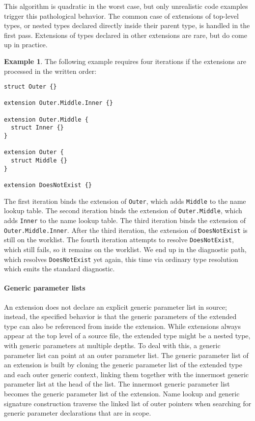 \documentclass[a4paper,headsepline,bibliography=totoc,toc=flat,fleqn,twoside=semi]{scrbook}
\theoremstyle{definition}
\theoremstyle{definition}
\newtheorem{example}{Example}[chapter]
\theoremstyle{definition}
\begin{document}
This algorithm is quadratic in the worst case, but only unrealistic code examples trigger this pathological behavior. The common case of extensions of top-level types, or nested types declared directly inside their parent type, is handled in the first pass. Extensions of types declared in other extensions are rare, but do come up in practice.

\begin{example}
The following example requires four iterations if the extensions are processed in the written order:
\begin{Verbatim}
struct Outer {}

extension Outer.Middle.Inner {}

extension Outer.Middle {
  struct Inner {}
}

extension Outer {
  struct Middle {}
}

extension DoesNotExist {}
\end{Verbatim}
The first iteration binds the extension of \texttt{Outer}, which adds \texttt{Middle} to the name lookup table. The second iteration binds the extension of \texttt{Outer.Middle}, which adds \texttt{Inner} to the name lookup table. The third iteration binds the extension of \texttt{Outer.Middle.Inner}. After the third iteration, the extension of \texttt{DoesNotExist} is still on the worklist. The fourth iteration attempts to resolve \texttt{DoesNotExist}, which still fails, so it remains on the worklist. We end up in the diagnostic path, which resolves \texttt{DoesNotExist} yet again, this time via ordinary type resolution which emits the standard diagnostic.
\end{example}

\paragraph{Generic parameter lists}
An extension does not declare an explicit generic parameter list in source; instead, the specified behavior is that the generic parameters of the extended type can also be referenced from inside the extension. While extensions always appear at the top level of a source file, the extended type might be a nested type, with generic parameters at multiple depths. To deal with this, a generic parameter list can point at an outer parameter list. The generic parameter list of an extension is built by cloning the generic parameter list of the extended type and each outer generic context, linking them together with the innermost generic parameter list at the head of the list. The innermost generic parameter list becomes the generic parameter list of the extension. Name lookup and generic signature construction traverse the linked list of outer pointers when searching for generic parameter declarations that are in scope.
\end{document}
